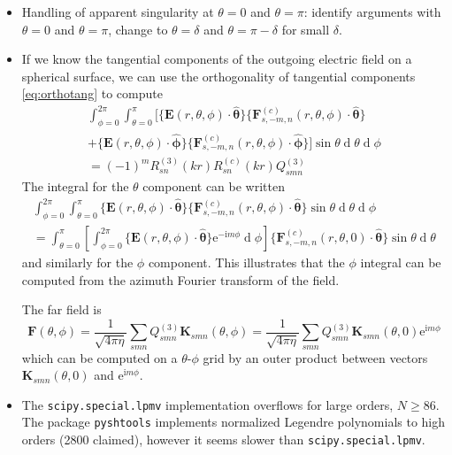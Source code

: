 \documentclass[a4paper,12pt]{article}
\renewcommand{\vec}[1]{\boldsymbol{#1}}
\newcommand{\unitvec}[1]{\hat{\vec{#1}}}
\newcommand{\mrm}[1]{\mathrm{#1}}
\newcommand{\diff}{\operatorname{d}\!}
\newcommand{\iu}{\mrm{i}}
\newcommand{\eu}{\mrm{e}}
\newcommand{\Ev}{\vec{E}}
\newcommand{\Fv}{\vec{F}}
\newcommand{\Kv}{\vec{K}}
\newcommand{\thetauv}{\unitvec{\theta}}
\newcommand{\phiuv}{\unitvec{\phi}}
\begin{document}
\begin{itemize}
\item Handling of apparent singularity at $\theta=0$ and $\theta=\pi$:
  identify arguments with $\theta=0$ and $\theta=\pi$, change to
  $\theta=\delta$ and $\theta=\pi-\delta$ for small $\delta$.

\item If we know the tangential components of the outgoing electric
  field on a spherical surface, we can use the orthogonality of
  tangential components \eqref{eq:orthotang} to compute
  \begin{multline}
    \int_{\phi=0}^{2\pi}\int_{\theta=0}^{\pi} \Big[ \{\Ev(r,\theta,\phi)\cdot\thetauv\} \{\Fv_{s,-m,n}^{(c)}(r,\theta,\phi)\cdot\thetauv\} \\
    + \{\Ev(r,\theta,\phi)\cdot\phiuv\} \{\Fv_{s,-m,n}^{(c)}(r,\theta,\phi)\cdot\phiuv\} \Big] \sin\theta\diff\theta\diff\phi \\
    = (-1)^{m}R_{sn}^{(3)}(kr)R_{sn}^{(c)}(kr)Q_{smn}^{(3)}
  \end{multline}
  The integral for the $\theta$ component can be written
  \begin{multline}
    \int_{\phi=0}^{2\pi}\int_{\theta=0}^{\pi} \{\Ev(r,\theta,\phi)\cdot\thetauv\} \{\Fv_{s,-m,n}^{(c)}(r,\theta,\phi)\cdot\thetauv\} \sin\theta\diff\theta\diff\phi \\
    = \int_{\theta=0}^{\pi} \left[ \int_{\phi=0}^{2\pi}\{\Ev(r,\theta,\phi)\cdot\thetauv\} \eu^{-\iu m\phi}\diff\phi\right] \{\Fv_{s,-m,n}^{(c)}(r,\theta,0)\cdot\thetauv\} \sin\theta\diff\theta
  \end{multline}
  and similarly for the $\phi$ component. This illustrates that the
  $\phi$ integral can be computed from the azimuth Fourier transform
  of the field.

  The far field is
  \begin{equation}
    \Fv(\theta,\phi) = \frac{1}{\sqrt{4\pi\eta}} \sum_{smn}Q_{smn}^{(3)}\Kv_{smn}(\theta,\phi) = \frac{1}{\sqrt{4\pi\eta}}\sum_{smn}Q_{smn}^{(3)}\Kv_{smn}(\theta,0)\eu^{\iu m\phi}
  \end{equation}
  which can be computed on a $\theta$-$\phi$ grid by an outer product
  between vectors $\Kv_{smn}(\theta,0)$ and $\eu^{\iu m\phi}$.
  
\item The \texttt{scipy.special.lpmv} implementation overflows for
  large orders, $N\geq86$. The package \texttt{pyshtools} implements
  normalized Legendre polynomials to high orders (2800 claimed),
  however it seems slower than \texttt{scipy.special.lpmv}.
\end{itemize}
\end{document}
